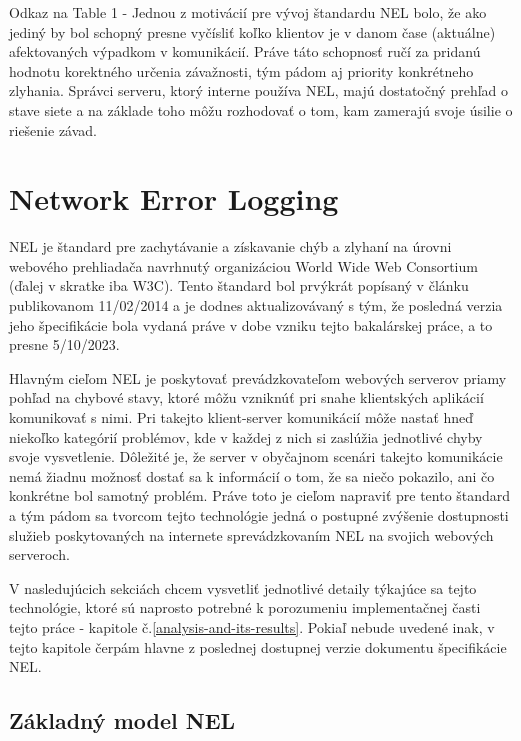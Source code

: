 
Odkaz na Table 1 - Jednou z motivácií pre vývoj štandardu NEL bolo, že ako jediný by bol schopný presne vyčísliť koľko klientov je
v danom čase (aktuálne) afektovaných výpadkom v komunikácií. Práve táto schopnosť ručí za pridanú hodnotu korektného určenia závažnosti,
tým pádom aj priority konkrétneho zlyhania. Správci serveru, ktorý interne používa NEL, majú dostatočný prehľad o stave siete a na základe 
toho môžu rozhodovať o tom, kam zamerajú svoje úsilie o riešenie závad.    

\section{Network Error Logging}


NEL je štandard pre zachytávanie a získavanie chýb a zlyhaní na úrovni webového prehliadača navrhnutý organizáciou World Wide Web 
Consortium (ďalej v skratke iba W3C). Tento štandard bol prvýkrát popísaný v článku publikovanom 11/02/2014 a je dodnes aktualizovávaný
s tým, že posledná verzia jeho špecifikácie bola vydaná práve v dobe vzniku tejto bakalárskej práce, a to presne 5/10/2023. 

Hlavným cieľom NEL je poskytovať prevádzkovateľom webových serverov priamy pohľad na chybové stavy, ktoré môžu vzniknúť pri snahe 
klientských aplikácií komunikovať s nimi. Pri takejto klient-server komunikácií môže nastať hneď niekoľko kategórií problémov, 
kde v každej z nich si zaslúžia jednotlivé chyby svoje vysvetlenie. Dôležité je, že server v obyčajnom scenári takejto komunikácie 
nemá žiadnu možnosť dostať sa k informácií o tom, že sa niečo pokazilo, ani čo konkrétne bol samotný problém. Práve toto je cieľom 
napraviť pre tento štandard a tým pádom sa tvorcom tejto technológie jedná o postupné zvýšenie dostupnosti služieb poskytovaných 
na internete sprevádzkovaním NEL na svojich webových serveroch.

V nasledujúcich sekciách chcem vysvetliť jednotlivé detaily týkajúce sa tejto technológie, ktoré sú naprosto potrebné k porozumeniu 
implementačnej časti tejto práce - kapitole č.\ref{analysis-and-its-results}. Pokiaľ nebude uvedené inak, v tejto kapitole čerpám hlavne 
z poslednej dostupnej verzie dokumentu špecifikácie NEL\cite{W3C-NEL}.

\subsection{Základný model NEL}

